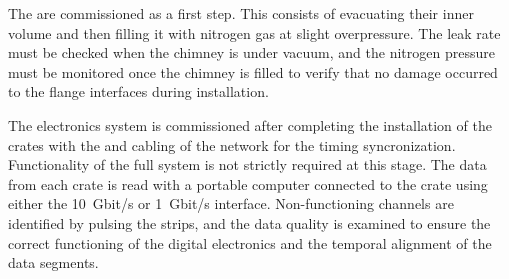 The  are commissioned as a first step. This consists of evacuating their inner volume and then filling it with nitrogen gas at slight overpressure. The leak rate must be checked when the chimney is under vacuum, and the nitrogen pressure must be monitored once the chimney is filled to verify that no damage occurred to the flange interfaces during installation.

The electronics system is commissioned after completing the installation of the  crates with the   and cabling of the  network for the timing syncronization. Functionality of the full  system is not strictly required at this stage. The data from each crate is read with a portable computer connected to the crate using either the  \SI{10}{Gbit/s} or \SI{1}{Gbit/s} interface. Non-functioning channels are identified by pulsing the  strips, and the data quality is examined to ensure the correct functioning of the digital electronics and the temporal alignment of the data segments.   
